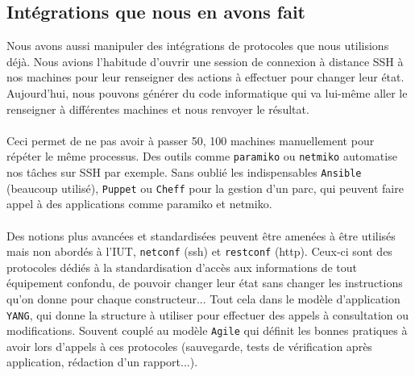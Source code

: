 \subsection{Intégrations que nous en avons fait}

Nous avons aussi manipuler des intégrations de protocoles que nous utilisions déjà. Nous avions l'habitude d'ouvrir une session de connexion à distance SSH à nos machines pour leur renseigner des actions à effectuer pour changer leur état. Aujourd'hui, nous pouvons générer du code informatique qui va lui-même aller le renseigner à différentes machines et nous renvoyer le résultat.
\\ \\
Ceci permet de ne pas avoir à passer 50, 100 machines manuellement pour répéter le même processus. Des outils comme \texttt{paramiko} ou \texttt{netmiko} automatise nos tâches sur SSH par exemple. Sans oublié les indispensables \texttt{Ansible} (beaucoup utilisé), \texttt{Puppet} ou \texttt{Cheff} pour la gestion d'un parc, qui peuvent faire appel à des applications comme paramiko et netmiko.
\\ \\
Des notions plus avancées et standardisées peuvent être amenées à être utilisés mais non abordés à l'IUT, \texttt{netconf} (ssh) et \texttt{restconf} (http). Ceux-ci sont des protocoles dédiés à la standardisation d'accès aux informations de tout équipement confondu, de pouvoir changer leur état sans changer les instructions qu'on donne pour chaque constructeur... Tout cela dans le modèle d'application \texttt{YANG}, qui donne la structure à utiliser pour effectuer des appels à consultation ou modifications. Souvent couplé au modèle \texttt{Agile} qui définit les bonnes pratiques à avoir lors d'appels à ces protocoles (sauvegarde, tests de vérification après application, rédaction d'un rapport...).